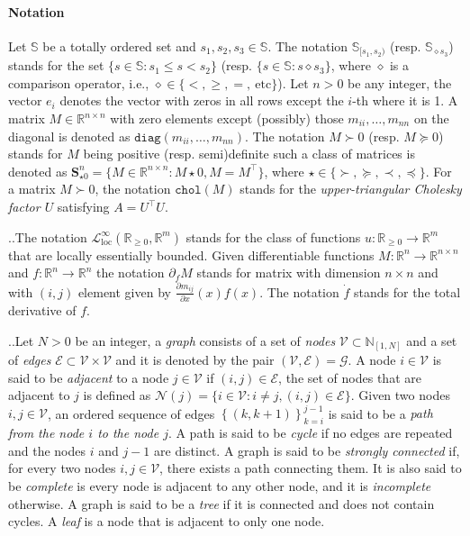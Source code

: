 \documentclass[10pt,twocolumn,twoside]{IEEEtran}
\newcounter{para}
\newcommand\mypara{\par \thesection.\refstepcounter{para}\thepara.\space}
\theoremstyle{plain}
\theoremstyle{definition}
\theoremstyle{remark}
\begin{document}
\paragraph{Notation} Let $\mathbb{S}$ be a totally ordered set and $s_1,s_2,s_3\in\mathbb{S}$. The notation $\mathbb{S}_{[s_1,s_2)}$ (resp. $\mathbb{S}_{\diamond s_3}$) stands for the set $\{s\in\mathbb{S}:s_1\leq s< s_2\}$ (resp. $\{s\in\mathbb{S}:s\diamond s_3\}$, where $\diamond$ is a comparison operator, i.e., $\diamond\in\{<,\geq,=,\ \text{etc}\}$). Let $n>0$ be any integer, the vector $e_i$ denotes the vector with zeros in all rows except the $i$-th where it is 1. A matrix $M\in\mathbb{R}^{n\times n}$ with zero elements except (possibly) those  $m_{ii},\ldots,m_{nn}$ on the diagonal is denoted as $\mathbin{\mathtt{diag}}(m_{ii},\ldots,m_{nn})$. The notation $M\succ 0$ (resp. $M\succeq 0$) stands for $M$ being positive (resp. semi)definite such a class of matrices is denoted as $\mathbf{S}_{\star0}^n=\{M\in\mathbb{R}^{n\times n}:M\star0,M=M^\top\}$, where $\star\in\{\succ,\succeq,\prec,\preceq\}$. For a matrix $M\succ0$, the notation $\mathbin{\mathtt{chol}}(M)$ stands for the \emph{upper-triangular Cholesky factor $U$} satisfying $A=U^\top U$.

\mypara The notation $\mathcal{L}_{\mathrm{loc}}^\infty(\mathbb{R}_{\geq0},\mathbb{R}^m)$ stands for the class of functions $u:\mathbb{R}_{\geq0}\to\mathbb{R}^m$ that are locally essentially bounded. Given differentiable functions $M:\mathbb{R}^n\to\mathbb{R}^{n\times n}$ and $f:\mathbb{R}^n\to\mathbb{R}^n$ the notation $\partial_fM$ stands for matrix with dimension $n\times n$ and with $(i,j)$ element given by $\frac{\partial m_{ij}}{\partial x}(x)f(x)$. The notation $\dot{f}$ stands for the total derivative of $f$.

\mypara Let $N>0$ be an integer, a \emph{graph} consists of a set of \emph{nodes} $\mathscr{V}\subset\mathbb{N}_{[1,N]}$ and a set of \emph{edges} $\mathscr{E}\subset\mathscr{V}\times\mathscr{V}$ and it is denoted by the pair $(\mathscr{V},\mathscr{E})=\mathscr{G}$. A node $i\in\mathscr{V}$ is said to be \emph{adjacent} to a node $j\in\mathscr{V}$ if $(i,j)\in\mathscr{E}$, the set of nodes that are adjacent to $j$ is defined as $\mathscr{N}(j)=\{i\in\mathscr{V}:i\neq j,(i,j)\in\mathscr{E}\}$. Given two nodes $i,j\in\mathscr{V}$, an ordered sequence of edges $\left\{(k,k+1)\right\}_{k=i}^{j-1}$ is said to be a \emph{path from the node $i$ to the node $j$}. A path is said to be \emph{cycle} if no edges are repeated and the nodes $i$ and $j-1$  are distinct. A graph is said to be \emph{strongly connected} if, for every two nodes $i,j\in\mathscr{V}$, there exists a path connecting them. It is also said to be \emph{complete} is every node is adjacent to any other node, and it is \emph{incomplete} otherwise. A graph is said to be a \emph{tree} if it is connected and does not contain cycles. A \emph{leaf} is a node that is adjacent to only one node.
\end{document}
